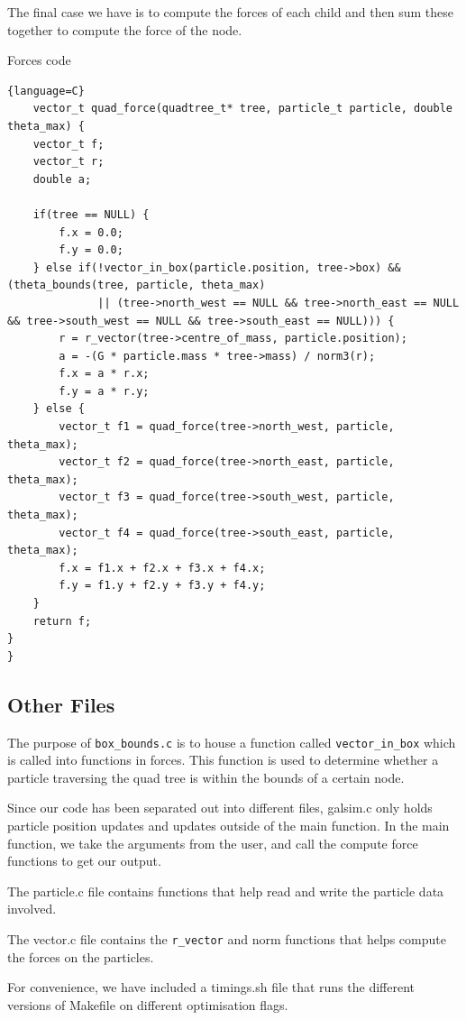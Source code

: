 The final case we have is to compute the forces of each child and then sum these together to compute the force of the node.
\begin{center}
    Forces code
\end{center}
\begin{lstlisting}{language=C}
    vector_t quad_force(quadtree_t* tree, particle_t particle, double theta_max) {
    vector_t f;
    vector_t r;
    double a;

    if(tree == NULL) {
        f.x = 0.0;
        f.y = 0.0;
    } else if(!vector_in_box(particle.position, tree->box) && (theta_bounds(tree, particle, theta_max)
              || (tree->north_west == NULL && tree->north_east == NULL && tree->south_west == NULL && tree->south_east == NULL))) {
        r = r_vector(tree->centre_of_mass, particle.position);
        a = -(G * particle.mass * tree->mass) / norm3(r);
        f.x = a * r.x;
        f.y = a * r.y;
    } else {
        vector_t f1 = quad_force(tree->north_west, particle, theta_max);
        vector_t f2 = quad_force(tree->north_east, particle, theta_max);
        vector_t f3 = quad_force(tree->south_west, particle, theta_max);
        vector_t f4 = quad_force(tree->south_east, particle, theta_max);
        f.x = f1.x + f2.x + f3.x + f4.x;
        f.y = f1.y + f2.y + f3.y + f4.y;
    }
    return f;
}
}
\end{lstlisting}
\subsection{Other Files}
The purpose of \verb|box_bounds.c| is to house a function called \verb|vector_in_box| which is called into functions in forces. This function is used to determine whether a particle traversing the quad tree is within the bounds of a certain node.

Since our code has been separated out into different files, galsim.c only holds particle position updates and updates outside of the main function. In the main function, we take the arguments from the user, and call the compute force functions to get our output.

The particle.c file contains functions that help read and write the particle data involved.

The vector.c file contains the \verb|r_vector| and norm functions that helps compute the forces on the particles.

For convenience, we have included a timings.sh file that runs the different versions of Makefile on different optimisation flags.
